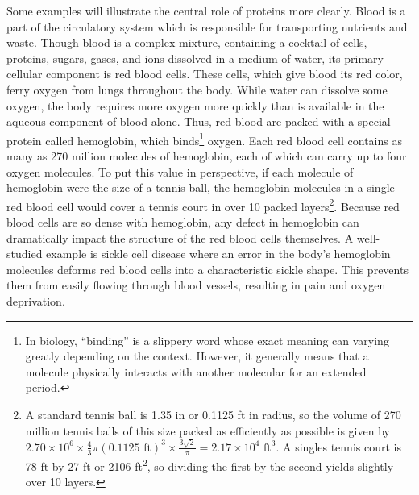 Some examples will illustrate the central role of proteins more clearly. Blood is a part of the circulatory system which is responsible for transporting nutrients and waste. Though blood is a complex mixture, containing a cocktail of cells, proteins, sugars, gases, and ions dissolved in a medium of water, its primary cellular component is red blood cells. These cells, which give blood its red color, ferry oxygen from lungs throughout the body. While water can dissolve some oxygen, the body requires more oxygen more quickly than is available in the aqueous component of blood alone. Thus, red blood are packed with a special protein called hemoglobin, which binds\footnote{In biology, ``binding'' is a slippery word whose exact meaning can varying greatly depending on the context. However, it generally means that a molecule physically interacts with another molecular for an extended period.} oxygen. Each red blood cell contains as many as 270 million molecules of hemoglobin, each of which can carry up to four oxygen molecules. To put this value in perspective, if each molecule of hemoglobin were the size of a tennis ball, the hemoglobin molecules in a single red blood cell would cover a tennis court in over 10 packed layers\footnote{A standard tennis ball is 1.35 in or 0.1125 ft in radius, so the volume of 270 million tennis balls of this size packed as efficiently as possible is given by $2.70 \times 10^6 \times \frac{4}{3} \pi (0.1125 \text{ ft})^3 \times \frac{3\sqrt{2}}{\pi} = 2.17 \times 10^4 \text{ ft}^3$. A singles tennis court is 78 ft by 27 ft or 2106 ft\textsuperscript{2}, so dividing the first by the second yields slightly over 10 layers.}. Because red blood cells are so dense with hemoglobin, any defect in hemoglobin can dramatically impact the structure of the red blood cells themselves. A well-studied example is sickle cell disease where an error in the body's hemoglobin molecules deforms red blood cells into a characteristic sickle shape. This prevents them from easily flowing through blood vessels, resulting in pain and oxygen deprivation.

